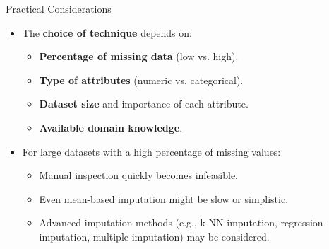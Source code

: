 \begin{frame}{Practical Considerations}
\begin{itemize}
  \item The \textbf{choice of technique} depends on:
  \begin{itemize}
    \item \textbf{Percentage of missing data} (low vs. high).
    \item \textbf{Type of attributes} (numeric vs. categorical).
    \item \textbf{Dataset size} and importance of each attribute.
    \item \textbf{Available domain knowledge}.
  \end{itemize}

  \item For large datasets with a high percentage of missing values:
  \begin{itemize}
    \item Manual inspection quickly becomes infeasible.
    \item Even mean-based imputation might be slow or simplistic.
    \item Advanced imputation methods (e.g., k-NN imputation, regression imputation, multiple imputation) may be considered.
  \end{itemize}
\end{itemize}
\end{frame}

